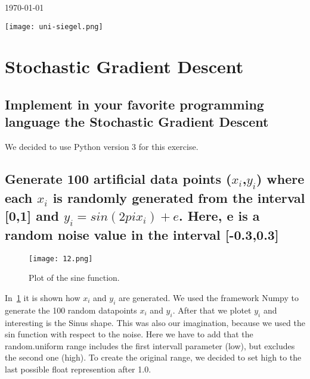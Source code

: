 \documentclass[11pt]{article}
\begin{document}
\begin{titlepage}
	
	
	\vfill\vfill\vfill %
	
	{\large\today} %
	
	
	\vfill\vfill
	\texttt{[image: uni-siegel.png]}\\[1cm] %
	 
	
	\vfill %
	
\end{titlepage}

\section{Stochastic Gradient Descent}

\subsection{Implement in your favorite programming language the Stochastic Gradient Descent}

We decided to use Python version 3 for this exercise.

\subsection{Generate 100 artificial data points ($x_i$,$y_i$) where each $x_i$ is randomly generated from the interval [0,1] and $y_i = sin(2pi x_i) + e$. Here, e is a random noise value in the interval [-0.3,0.3]}


\begin{figure}[ht]
    \centering
    \texttt{[image: 12.png]}
    \caption{Plot of the sine function.}
    \label{12plot}
\end{figure}
In~\ref{12plot} it is shown how $x_i$ and $y_i$ are generated. We used the framework Numpy to generate the 100 random datapoints $x_i$ and $y_i$. After that we plotet $y_i$ and interesting is the Sinus shape. This was also our imagination, because we used the sin function with respect to the noise. Here we have to add that the random.uniform range includes the first intervall parameter (low), but excludes the second one (high). To create the original range, we decided to set high to the last possible float represention after 1.0.   
\end{document}
